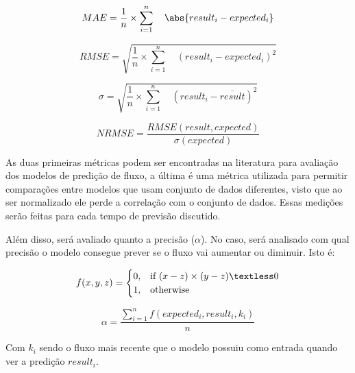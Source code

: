 \begin{equation}
MAE = \frac{1}{n} \times \sum_{i=1}^{n} \quad \abs{result_i - expected_i}
\end{equation}

\begin{equation}
RMSE = \sqrt{ \frac{1}{n} \times \sum_{i=1}^{n} \quad (result_i - expected_i) ^ 2}
\end{equation}

\begin{equation}
\sigma = \sqrt{ \frac{1}{n} \times \sum_{i=1}^{n} \quad (result_i - \overline{result}) ^ 2}
\end{equation}

\begin{equation}
NRMSE = \frac{RMSE(result, expected)}{\sigma(expected)}
\end{equation}

As duas primeiras métricas podem ser encontradas na literatura para avaliação dos modelos de predição de fluxo, a última é uma métrica utilizada para permitir comparações entre modelos que usam conjunto de dados diferentes, visto que ao ser normalizado ele perde a correlação com o conjunto de dados. Essas medições serão feitas para cada tempo de previsão discutido.

Além disso, será avaliado quanto a precisão (\(\alpha\)). No caso, será analisado com qual precisão o modelo consegue prever se o fluxo vai aumentar ou diminuir. Isto é:

\begin{equation}
f(x, y, z) =
\begin{cases}
  0, & \text{if}\ (x - z) \times (y - z) \textless 0 \\
  1, & \text{otherwise}
\end{cases}
\end{equation}

\begin{equation}
\alpha = \frac{\sum_{i=1}^{n} f(expected_i, result_i, k_i)}{n}
\end{equation}

Com \(k_i\) sendo o fluxo mais recente que o modelo possuiu como entrada quando ver a predição \(result_i\).

